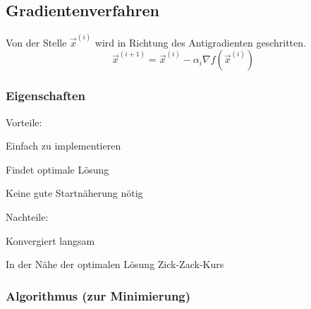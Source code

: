   \begin{minipage}[t]{8.5cm}
 \subsection{Gradientenverfahren}
    Von der Stelle $\vec{x}^{(i)}$ wird in Richtung des Antigradienten geschritten. 
    $$\vec{x}^{(i+1)} = \vec{x}^{(i)} - \alpha_i \nabla f(\vec{x}^{(i)})$$
\subsubsection{Eigenschaften}    
    Vorteile:
    \begin{liste}
      \item Einfach zu implementieren
      \item Findet optimale Lösung
      \item Keine gute Startnäherung nötig
    \end{liste}
    
    Nachteile:
    \begin{liste}
      \item Konvergiert langsam
      \item In der Nähe der optimalen Lösung Zick-Zack-Kurs
    \end{liste}
    
    \subsubsection{Algorithmus (zur Minimierung)}
  \end{minipage}
  \hfill
